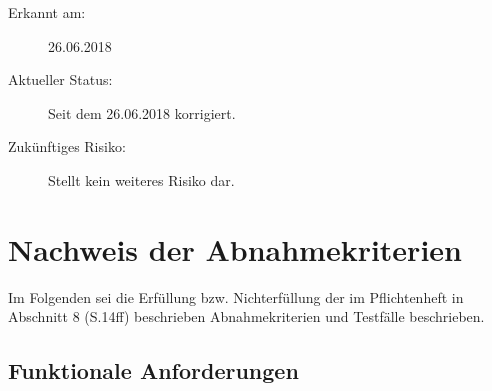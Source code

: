 \documentclass[12pt,a4paper,ngerman,enabledeprecatedfontcommands]{scrreprt}
\begin{document}
\begin{description}

    \item[Erkannt am:] 26.06.2018
    
    \item[Aktueller Status:] Seit dem 26.06.2018 korrigiert. 
    
    \item[Zukünftiges Risiko:] Stellt kein weiteres Risiko dar. 
    
\end{description}
\smallskip

\chapter{Nachweis der Abnahmekriterien}
Im Folgenden sei die Erfüllung bzw. Nichterfüllung der im Pflichtenheft in Abschnitt 8 (S.14ff) beschrieben Abnahmekriterien und Testfälle beschrieben.\\

\section{Funktionale Anforderungen}
\end{document}
